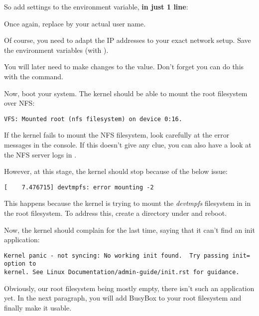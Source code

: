 So add settings to the  environment variable,
{\bf in just 1 line}:

{\footnotesize
{}
}

Once again, replace  by your actual user name.

Of course, you need to adapt the IP addresses to your exact network
setup. Save the environment variables (with ).

You will later need to make changes to the  value.
Don't forget you can do this with the  command.

Now, boot your system. The kernel should be able to mount the root
filesystem over NFS:

\begin{verbatim}
VFS: Mounted root (nfs filesystem) on device 0:16.
\end{verbatim}

If the kernel fails to mount the NFS filesystem, look carefully at the
error messages in the console. If this doesn't give any clue, you can
also have a look at the NFS server logs in .

However, at this stage, the kernel should stop because of the below
issue:

\begin{verbatim}
[    7.476715] devtmpfs: error mounting -2
\end{verbatim}

This happens because the kernel is trying to mount the {\em devtmpfs}
filesystem in  in the root filesystem. To address this,
create a  directory under  and reboot.

Now, the kernel should complain for the last time, saying that it can't
find an init application:

\begin{verbatim}
Kernel panic - not syncing: No working init found.  Try passing init= option to
kernel. See Linux Documentation/admin-guide/init.rst for guidance.
\end{verbatim}

Obviously, our root filesystem being mostly empty, there isn't such an
application yet. In the next paragraph, you will add BusyBox to your root
filesystem and finally make it usable.

